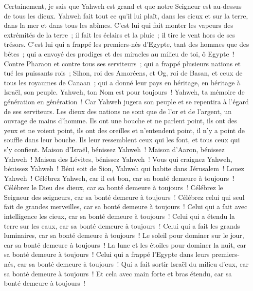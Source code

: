 \begin{multicols}{2}
Certainement, je sais que Yahweh est grand et que notre Seigneur est au-dessus de tous les dieux.
Yahweh fait tout ce qu'il lui plaît, dans les cieux et sur la terre, dans la mer et dans tous les abîmes.
C'est lui qui fait monter les vapeurs des extrémités de la terre~; il fait les éclairs et la pluie~; il tire le vent hors de ses trésors.
C'est lui qui a frappé les premiers-nés d'Egypte, tant des hommes que des bêtes~;
qui a envoyé des prodiges et des miracles au milieu de toi, ô Egypte~! Contre Pharaon et contre tous ses serviteurs~;
qui a frappé plusieurs nations et tué les puissants rois~;
Sihon, roi des Amoréens, et Og, roi de Basan, et ceux de tous les royaumes de Canaan~;
qui a donné leur pays en héritage, en héritage à Israël, son peuple.
Yahweh, ton Nom est pour toujours~! Yahweh, ta mémoire de génération en génération~!
Car Yahweh jugera son peuple et se repentira à l'égard de ses serviteurs.
Les dieux des nations ne sont que de l'or et de l'argent, un ouvrage de mains d'homme.
Ils ont une bouche et ne parlent point, ils ont des yeux et ne voient point,
ils ont des oreilles et n'entendent point, il n'y a point de souffle dans leur bouche.
Ils leur ressemblent ceux qui les font, et tous ceux qui s'y confient.
Maison d'Israël, bénissez Yahweh~! Maison d'Aaron, bénissez Yahweh~!
Maison des Lévites, bénissez Yahweh~! Vous qui craignez Yahweh, bénissez Yahweh~!
Béni soit de Sion, Yahweh qui habite dans Jérusalem~! Louez Yahweh~!
\VerseOne{}Célébrez Yahweh, car il est bon, car sa bonté demeure à toujours~!
Célébrez le Dieu des dieux, car sa bonté demeure à toujours~!
Célébrez le Seigneur des seigneurs, car sa bonté demeure à toujours~!
Célébrez celui qui seul fait de grandes merveilles, car sa bonté demeure à toujours~!
Celui qui a fait avec intelligence les cieux, car sa bonté demeure à toujours~!
Celui qui a étendu la terre sur les eaux, car sa bonté demeure à toujours~!
Celui qui a fait les grands luminaires, car sa bonté demeure à toujours~!
Le soleil pour dominer sur le jour, car sa bonté demeure à toujours~!
La lune et les étoiles pour dominer la nuit, car sa bonté demeure à toujours~!
Celui qui a frappé l'Egypte dans leurs premiers-nés, car sa bonté demeure à toujours~!
Qui a fait sortir Israël du milieu d'eux, car sa bonté demeure à toujours~!
Et cela avec main forte et bras étendu, car sa bonté demeure à toujours~!

\end{multicols}
